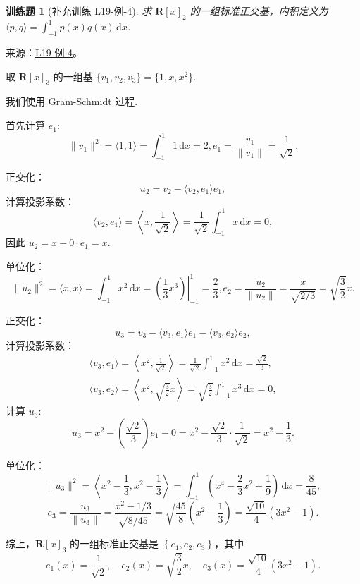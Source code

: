 \documentclass[12pt,fontset=fandol]{ctexart}
\newtheorem{exercise}{训练题}[section]
\begin{document}
\begin{exercise}[补充训练 L19-例-4]\label{prob:L19-例-4}
求 $\mathbf{R}[x]_2$ 的一组标准正交基，内积定义为 $\langle p, q \rangle = \displaystyle\int_{-1}^1 p(x)q(x)\,\mathrm{d}x$.
\end{exercise}
\noindent 来源：\href{https://github.com/yhwu-is/Linear-Algebra-Left-Undone/blob/new/%E8%AE%B2%E4%B9%89/%E4%B8%93%E9%A2%98/19%20%E5%86%85%E7%A7%AF%E7%A9%BA%E9%97%B4.tex}{L19-例-4}。
\begin{solve}
取 $\mathbf{R}[x]_3$ 的一组基 $\{v_1, v_2, v_3\} = \{1, x, x^2\}$.

    我们使用 Gram-Schmidt 过程.

    首先计算 $e_1$:
    \[ \lVert v_1 \rVert^2 = \langle 1, 1 \rangle = \int_{-1}^1 1 \,\mathrm{d}x = 2, e_1 = \frac{v_1}{\lVert v_1 \rVert} = \frac{1}{\sqrt{2}}. \]

    正交化：
    \[ u_2 = v_2 - \langle v_2, e_1 \rangle e_1, \]
    计算投影系数：
    \[ \langle v_2, e_1 \rangle = \left\langle x, \frac{1}{\sqrt{2}} \right\rangle = \frac{1}{\sqrt{2}} \int_{-1}^1 x \,\mathrm{d}x = 0, \]
    因此 $u_2 = x - 0 \cdot e_1 = x$.

    单位化：
    \[ \lVert u_2 \rVert^2 = \langle x, x \rangle = \int_{-1}^1 x^2 \,\mathrm{d}x = \left.\left(\frac{1}{3}x^3\right)\right\vert_{-1}^1= \frac{2}{3}, e_2 = \frac{u_2}{\lVert u_2 \rVert} = \frac{x}{\sqrt{2/3}} = \sqrt{\frac{3}{2}} x. \]

    正交化：
    \[ u_3 = v_3 - \langle v_3, e_1 \rangle e_1 - \langle v_3, e_2 \rangle e_2, \]
    计算投影系数：
    \begin{gather*}
        \langle v_3, e_1 \rangle = \left\langle x^2, \frac{1}{\sqrt{2}} \right\rangle = \frac{1}{\sqrt{2}} \int_{-1}^1 x^2 \,\mathrm{d}x = \frac{\sqrt{2}}{3}, \\
        \langle v_3, e_2 \rangle = \left\langle x^2, \sqrt{\frac{3}{2}} x \right\rangle = \sqrt{\frac{3}{2}} \int_{-1}^1 x^3 \,\mathrm{d}x = 0,
    \end{gather*}
    计算 $u_3$:
    \[ u_3 = x^2 - \left(\frac{\sqrt{2}}{3}\right) e_1 - 0 = x^2 - \frac{\sqrt{2}}{3} \cdot \frac{1}{\sqrt{2}} = x^2 - \frac{1}{3}. \]

    单位化：
    \[ \lVert u_3 \rVert^2 = \left\langle x^2 - \frac{1}{3}, x^2 - \frac{1}{3} \right\rangle = \int_{-1}^1 \left(x^4 - \frac{2}{3}x^2 + \frac{1}{9}\right) \,\mathrm{d}x = \frac{8}{45}, \]
    \[ e_3 = \frac{u_3}{\lVert u_3 \rVert} = \frac{x^2 - 1/3}{\sqrt{8/45}} = \sqrt{\frac{45}{8}} \left(x^2 - \frac{1}{3}\right) = \frac{\sqrt{10}}{4} (3x^2 - 1). \]

    综上，$\mathbf{R}[x]_3$ 的一组标准正交基是 $\left\{e_1, e_2, e_3\right\}$，其中
    \[ e_1(x) = \frac{1}{\sqrt{2}}, \quad e_2(x) = \sqrt{\frac{3}{2}} x, \quad e_3(x) = \frac{\sqrt{10}}{4} (3x^2 - 1). \]
\end{solve}
\end{document}
